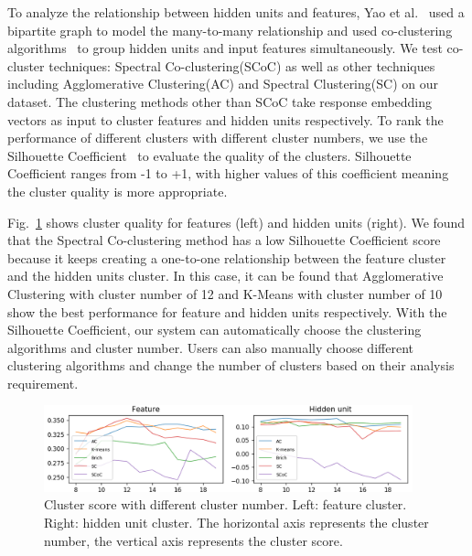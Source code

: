 To analyze the relationship between hidden units and features, Yao et al.~\cite{ming2017understanding} used a bipartite graph to model the many-to-many relationship and used co-clustering algorithms~\cite{dhillon2001co} to group hidden units and input features simultaneously. We test co-cluster techniques: Spectral Co-clustering(SCoC) as well as other techniques including Agglomerative Clustering(AC) and Spectral Clustering(SC) on our dataset. The clustering methods other than SCoC take response embedding vectors as input to cluster features and hidden units respectively. To rank the performance of different clusters with different cluster numbers, we use the Silhouette Coefficient~\cite{rousseeuw1987silhouettes} to evaluate the quality of the clusters. Silhouette Coefficient ranges from -1 to +1,  with higher values of this coefficient meaning the cluster quality is more appropriate. 


Fig.~\ref{fig:cluster_parameters} shows cluster quality for features (left) and hidden units (right). We found that the Spectral Co-clustering method has a low Silhouette Coefficient score because it keeps creating a one-to-one relationship between the feature cluster and the hidden units cluster. In this case, it can be found that Agglomerative Clustering with cluster number of 12 and K-Means with cluster number of 10 show the best performance for feature and hidden units respectively.
With the Silhouette Coefficient, our system can automatically choose the clustering algorithms and cluster number.
Users can also manually choose different clustering algorithms and change the number of clusters based on their analysis requirement.



\begin{figure}[t]
	\centering
	\includegraphics[width=0.95\textwidth]{figure/MultiRNNExplorer/methods/cluster_parameters.png}
	\vspace{-3mm}
	\caption{Cluster score with different cluster number. Left: feature cluster. Right: hidden unit cluster. The horizontal axis represents the cluster number, the vertical axis represents the cluster score. 
	}
	\label{fig:cluster_parameters}
	\vspace{-1mm}
\end{figure}

